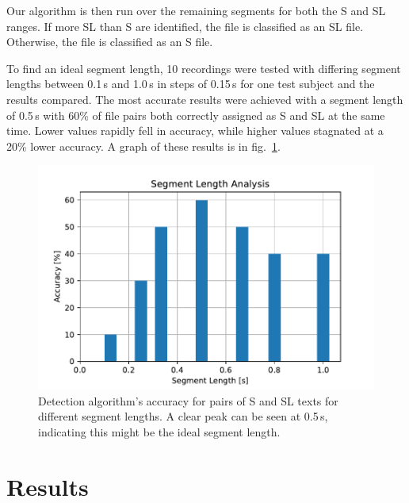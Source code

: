 \documentclass{IEEEtran}
\begin{document}
Our algorithm is then run over the remaining segments for both the S and SL ranges.
If more SL than S are identified,
the file is classified as an SL file.
Otherwise,
the file is classified as an S file.

To find an ideal segment length,
10 recordings were tested with differing segment lengths between 0.1\,s and 1.0\,s in steps of 0.15\,s for one test subject and the results compared.
The most accurate results were achieved with a segment length of 0.5\,s with 60\% of file pairs both correctly assigned as S and SL at the same time. %
Lower values rapidly fell in accuracy,
while higher values stagnated at a 20\% lower accuracy.
A graph of these results is in fig.\ \ref{segmentlength}.

\begin{figure}[h]
\centering
\includegraphics[scale=0.5]{seglen.pdf}
\caption{Detection algorithm's accuracy for pairs of S and SL texts for different segment lengths. A clear peak can be seen at 0.5\,s, indicating this might be the ideal segment length.}\label{segmentlength}
\end{figure}

\section{Results}
\end{document}

